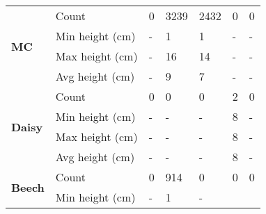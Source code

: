 \begin{table}[htb!]
\begin{tabular}{|p{2cm}|p{2cm}|p{1.5cm}|p{1.5cm}|p{1.5cm}|p{1.5cm}|p{1.5cm}|}
		\multirow{4}{*}{\textbf{MC}} & 
						\multicolumn{1}{l|}{Count} & 
						\multicolumn{1}{l|}{0} & 
						\multicolumn{1}{l|}{3239} &
						\multicolumn{1}{l|}{2432} &
						\multicolumn{1}{l|}{0} & 
						\multicolumn{1}{l|}{0} \\\cline{2-7} &
						\multicolumn{1}{l|}{Min height (cm)} & 
						\multicolumn{1}{l|}{-} &
						\multicolumn{1}{l|}{1} & 
						\multicolumn{1}{l|}{1} &
						\multicolumn{1}{l|}{-} & 
						\multicolumn{1}{l|}{-} \\\cline{2-7} &
						\multicolumn{1}{l|}{Max height (cm)} & 
						\multicolumn{1}{l|}{-} & 
						\multicolumn{1}{l|}{16} &
						\multicolumn{1}{l|}{14} &
						\multicolumn{1}{l|}{-} & 
						\multicolumn{1}{l|}{-} \\\cline{2-7} &
						\multicolumn{1}{l|}{Avg height (cm)} & 
						\multicolumn{1}{l|}{-} & 
						\multicolumn{1}{l|}{9} &
						\multicolumn{1}{l|}{7} &
						\multicolumn{1}{l|}{-} & 
						\multicolumn{1}{l|}{-} \\\cline{2-7}
		\hline      
		\multirow{4}{*}{\textbf{Daisy}} & 
						\multicolumn{1}{l|}{Count} & 
						\multicolumn{1}{l|}{0} & 
						\multicolumn{1}{l|}{0} &
						\multicolumn{1}{l|}{0} &
						\multicolumn{1}{l|}{2} & 
						\multicolumn{1}{l|}{0} \\\cline{2-7} &
						\multicolumn{1}{l|}{Min height (cm)} & 
						\multicolumn{1}{l|}{-} &
						\multicolumn{1}{l|}{-} & 
						\multicolumn{1}{l|}{-} &
						\multicolumn{1}{l|}{8} & 
						\multicolumn{1}{l|}{-} \\\cline{2-7} &
						\multicolumn{1}{l|}{Max height (cm)} & 
						\multicolumn{1}{l|}{-} &
						\multicolumn{1}{l|}{-} & 
						\multicolumn{1}{l|}{-} &
						\multicolumn{1}{l|}{8} & 
						\multicolumn{1}{l|}{-} \\\cline{2-7} &
						\multicolumn{1}{l|}{Avg height (cm)} & 
						\multicolumn{1}{l|}{-} &
						\multicolumn{1}{l|}{-} & 
						\multicolumn{1}{l|}{-} &
						\multicolumn{1}{l|}{8} & 
						\multicolumn{1}{l|}{-} \\\cline{2-7}
		\hline     
		\multirow{4}{*}{\textbf{Beech}} & 
						\multicolumn{1}{l|}{Count} & 
						\multicolumn{1}{l|}{0} & 
						\multicolumn{1}{l|}{914} &
						\multicolumn{1}{l|}{0} &
						\multicolumn{1}{l|}{0} & 
						\multicolumn{1}{l|}{0} \\\cline{2-7} &
						\multicolumn{1}{l|}{Min height (cm)} & 
						\multicolumn{1}{l|}{-} &
						\multicolumn{1}{l|}{1} & 
						\multicolumn{1}{l|}{-} &

\end{tabular}
\end{table}
